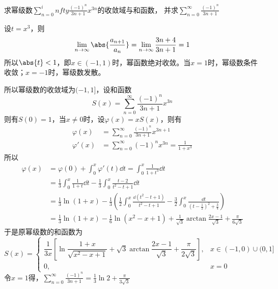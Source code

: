 \begin{example}
    求幂级数$\displaystyle\sum_{n=0}^infty \frac{(-1)^n}{3n+1}x^{3n}$的收敛域与和函数，
    并求$\displaystyle\sum_{n=0}^\infty\frac{(-1)^n}{3n+1}$
\end{example}
\begin{solution}
    设$t=x^3$，则
    \[
        \lim_{n\to\infty} \abs{\frac{a_{n+1}}{a_n}}
        =
        \lim_{n\to\infty} \frac{3n+4}{3n+1}
        =
        1
    \]
    所以$\abs{t}<1$，即$x\in(-1,1)$时，幂函数绝对收敛。当$x=1$时，幂级数条件收敛；$x=-1$时，幂级数发散。

    所以幂级数的收敛域为$(-1,1]$，设和函数
    \[ S(x) = \sum_{n=0}^\infty \frac{(-1)^n}{3n+1}x^{3n} \]
    则有$S(0)=1$，当$x\neq 0$时，设$\varphi(x) = xS(x)$，则有
    \begin{align*}
        \varphi(x)  & = \sum_{n=0}^\infty \frac{(-1)^n}{3n+1}x^{3n+1}     \\
        \varphi'(x) & = \sum_{n=0}^\infty (-1)^n x^{3n} = \frac{1}{1+x^3}
    \end{align*}
    所以
    \begin{align*}
        \varphi(x)
         & = \varphi(0) + \int_0^x \varphi'(t)\dd{t} = \int_0^x \frac{1}{1+t^3}\dd{t}                                                                                               \\
         & = \frac{1}{3}\int_0^x \frac{1}{1+t}\dd{t} - \frac{1}{3}\int_0^x \frac{t-2}{t^2-t+1}\dd{t}                                                                                \\
         & = \frac{1}{3}\ln(1+x) - \frac{1}{3}\left( \frac{1}{2}\int_0^x \frac{\dd(t^2-t+1)}{t^2-t+1} - \frac{3}{2}\int_0^x \frac{\dd{t}}{(t-\frac{1}{2})^2 + \frac{3}{4}}  \right) \\
         & = \frac{1}{3}\ln(1+x) - \frac{1}{6}\ln(x^2-x+1) + \frac{1}{\sqrt{3}}\arctan\frac{2x-1}{\sqrt{3}} +\frac{\pi}{6\sqrt{3}}
    \end{align*}
    于是原幂级数的和函数为
    \[
        S(x) =
        \begin{cases}
            \dfrac{1}{3x}\left[\ln\dfrac{1+x}{\sqrt{x^2-x+1}}+ \sqrt{3}\arctan\dfrac{2x-1}{\sqrt{3}} + \dfrac{\pi}{2\sqrt{3}}\right], & x\in(-1,0)\cup(0,1] \\
            0,                                                                                                                        & x=0
        \end{cases}
    \]
    令$x=1$得，$\displaystyle\sum_{n=0}^\infty\frac{(-1)^n}{3n+1} = \frac{1}{3}\ln 2 + \frac{\pi}{3\sqrt{3}}$
\end{solution}

